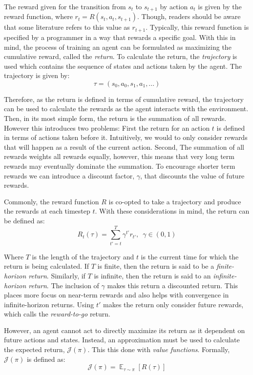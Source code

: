 \documentclass[conference]{IEEEtran}
\begin{document}
The reward given for the transition from $s_t$ to $s_{t+1}$ by action $a_t$ is given by the reward function, where $r_t = R(s_t, a_t, s_{t+1})$. Though, readers should be aware that some literature refers to this value as $r_{t+1}$. Typically, this reward function is specified by a programmer in a way that rewards a specific goal. With this in mind, the process of training an agent can be formulated as maximizing the cumulative reward, called the \textit{return}. To calculate the return, the \textit{trajectory} is used which contains the sequence of states and actions taken by the agent. The trajectory is given by:
$$
    \tau = (s_0, a_0, s_1, a_1, ...)
$$

Therefore, as the return is defined in terms of cumulative reward, the trajectory can be used to calculate the rewards as the agent interacts with the environment. Then, in its most simple form, the return is the summation of all rewards. However this introduces two problems: First the return for an action $t$ is defined in terms of actions taken before it. Intuitively, we would to only consider rewards that will happen as a result of the current action. Second, The summation of all rewards weights all rewards equally, however, this means that very long term rewards may eventually dominate the summation. To encourage shorter term rewards we can introduce a discount factor, $\gamma$, that discounts the value of future rewards.

Commonly, the reward function $R$ is co-opted to take a trajectory and produce the rewards at each timestep $t$. With these considerations in mind, the return can be defined as:
$$
    R_t(\tau) = \sum_{t'=t}^T \gamma^{t'} r_{t'}, \enspace \gamma \in (0, 1)
$$

Where $T$ is the length of the trajectory and $t$ is the current time for which the return is being calculated. If $T$ is finite, then the return is said to be a \textit{finite-horizon return}. Similarly, if $T$ is infinite, then the return is said to an \textit{infinite-horizon return}. The inclusion of $\gamma$ makes this return a discounted return. This places more focus on near-term rewards and also helps with convergence in infinite-horizon returns. Using $t'$ makes the return only consider future rewards, which \cite{spinning_up_policy_optimization} calls the \textit{reward-to-go} return.

However, an agent cannot act to directly maximize its return as it dependent on future actions and states. Instead, an approximation must be used to calculate the expected return, $\mathcal{J}(\pi)$. This this done with \textit{value functions}. Formally, $\mathcal{J}(\pi)$ is defined as:
$$
    \mathcal{J}(\pi) = \mathop{\mathbb{E}}_{\tau \sim \pi}[R(\tau)]
$$
\end{document}

